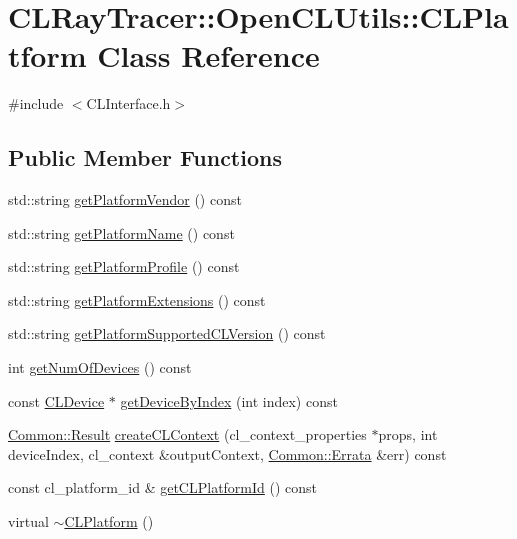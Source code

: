 \hypertarget{class_c_l_ray_tracer_1_1_open_c_l_utils_1_1_c_l_platform}{}\section{C\+L\+Ray\+Tracer\+:\+:Open\+C\+L\+Utils\+:\+:C\+L\+Platform Class Reference}
\label{class_c_l_ray_tracer_1_1_open_c_l_utils_1_1_c_l_platform}


{\ttfamily \#include $<$C\+L\+Interface.\+h$>$}

\subsection*{Public Member Functions}
\begin{DoxyCompactItemize}
\item 
std\+::string \hyperlink{class_c_l_ray_tracer_1_1_open_c_l_utils_1_1_c_l_platform_a2a06417446f80c99b965a3195d56bc96}{get\+Platform\+Vendor} () const 
\item 
std\+::string \hyperlink{class_c_l_ray_tracer_1_1_open_c_l_utils_1_1_c_l_platform_a40181506f0437304fa5aed612692694b}{get\+Platform\+Name} () const 
\item 
std\+::string \hyperlink{class_c_l_ray_tracer_1_1_open_c_l_utils_1_1_c_l_platform_a04d906c241a534e4dc42239f7ac74758}{get\+Platform\+Profile} () const 
\item 
std\+::string \hyperlink{class_c_l_ray_tracer_1_1_open_c_l_utils_1_1_c_l_platform_a25e19fc3360361a89d5ff632db1433ee}{get\+Platform\+Extensions} () const 
\item 
std\+::string \hyperlink{class_c_l_ray_tracer_1_1_open_c_l_utils_1_1_c_l_platform_a1bd75c01dd72e49cb2e900dc1c03e07c}{get\+Platform\+Supported\+C\+L\+Version} () const 
\item 
int \hyperlink{class_c_l_ray_tracer_1_1_open_c_l_utils_1_1_c_l_platform_a21bf865ef948fcffe2b76e52c899f1d6}{get\+Num\+Of\+Devices} () const 
\item 
const \hyperlink{class_c_l_ray_tracer_1_1_open_c_l_utils_1_1_c_l_device}{C\+L\+Device} $\ast$ \hyperlink{class_c_l_ray_tracer_1_1_open_c_l_utils_1_1_c_l_platform_a52a78c49e84ac4813e10b590d045a3e9}{get\+Device\+By\+Index} (int index) const 
\item 
\hyperlink{_errata_8h_a389396702f1aff6e71eb21328b0775c1}{Common\+::\+Result} \hyperlink{class_c_l_ray_tracer_1_1_open_c_l_utils_1_1_c_l_platform_ae521775717f3b8e708e0e839d912f7c0}{create\+C\+L\+Context} (cl\+\_\+context\+\_\+properties $\ast$props, int device\+Index, cl\+\_\+context \&output\+Context, \hyperlink{class_c_l_ray_tracer_1_1_common_1_1_errata}{Common\+::\+Errata} \&err) const 
\item 
const cl\+\_\+platform\+\_\+id \& \hyperlink{class_c_l_ray_tracer_1_1_open_c_l_utils_1_1_c_l_platform_aa967f14b85bcd28f17db4e8527df0146}{get\+C\+L\+Platform\+Id} () const 
\item 
virtual \hyperlink{class_c_l_ray_tracer_1_1_open_c_l_utils_1_1_c_l_platform_a2f8a44f1863605f5e4716ee9fa495583}{$\sim$\+C\+L\+Platform} ()
\end{DoxyCompactItemize}
